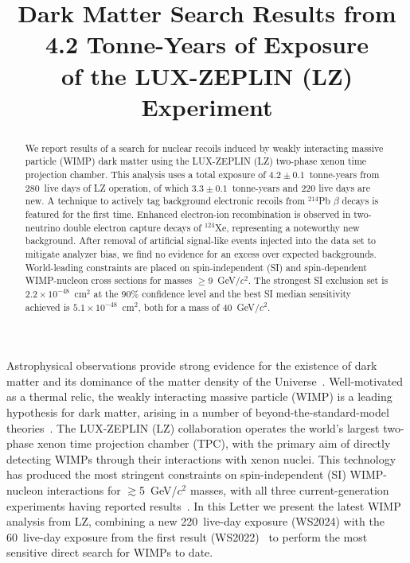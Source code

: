 \documentclass[%
 reprint,
 superscriptaddress,
 amsmath,amssymb,
 prl,
floatfix,
]{revtex4-2}
\begin{document}
\title{Dark Matter Search Results from 4.2 Tonne-Years of Exposure \\ of the LUX-ZEPLIN (LZ) Experiment} %


\begin{abstract}
We report results of a search for nuclear recoils induced by weakly interacting massive particle (WIMP) dark matter using the LUX-ZEPLIN (LZ) two-phase xenon time projection chamber. This analysis uses a total exposure of $4.2\pm0.1$~tonne-years from 280~live days of LZ operation, of which $3.3\pm0.1$~tonne-years and 220 live days are new. A technique to actively tag background electronic recoils from $^{214}$Pb $\beta$ decays is featured for the first time. Enhanced electron-ion recombination is observed in two-neutrino double electron capture decays of $^{124}$Xe, representing a noteworthy new background. After removal of artificial signal-like events injected into the data set to mitigate analyzer bias, we find no evidence for an excess over expected backgrounds. World-leading constraints are placed on spin-independent (SI) and spin-dependent WIMP-nucleon cross sections for masses $\geq$9~GeV/$c^2$. The strongest SI exclusion set is $2.2\times10^{-48}$~cm$^{2}$ at the 90\% confidence level and the best SI median sensitivity achieved is $5.1\times10^{-48}$~cm$^{2}$, both for a mass of 40~GeV/$c^2$.
\end{abstract}

\maketitle

Astrophysical observations provide strong evidence for the existence of dark matter and its dominance of the matter density of the Universe~\cite{Aghanim2020, SofueRubin, harvey2015nongravitational, ARBEY2021103865}. Well-motivated as a thermal relic, the weakly interacting massive particle (WIMP) is a leading hypothesis for dark matter, arising in a number of beyond-the-standard-model theories~\cite{RevModPhys.90.045002, Billard2022,akerib2022snowmass2021}. The LUX-ZEPLIN (LZ) collaboration operates the world’s largest two-phase xenon time projection chamber (TPC), with the primary aim of directly detecting WIMPs through their interactions with xenon nuclei. This technology has produced the most stringent constraints on spin-independent (SI) WIMP-nucleon interactions for $\gtrsim$5~GeV/$c^2$ masses, with all three current-generation experiments having reported results~\cite{SR1WS, XENON:2023cxc, PandaX:2024qfu}. In this Letter we present the latest WIMP analysis from LZ, combining a new 220~live-day exposure (WS2024) with the 60~live-day exposure from the first result (WS2022)~\cite{SR1WS} to perform the most sensitive direct search for WIMPs to date.
\end{document}

